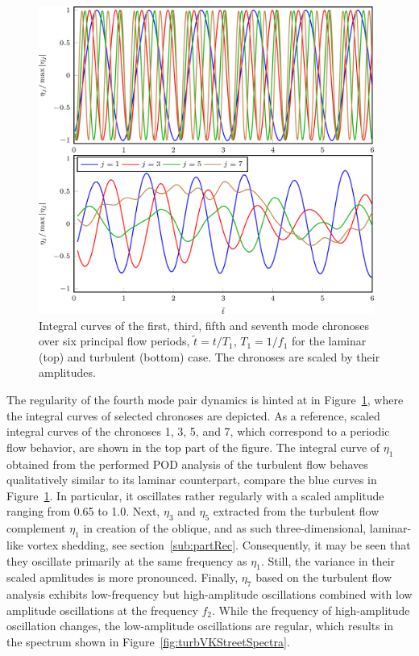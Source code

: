 \begin{figure}[tbp]
    \centering
    \includegraphics[width=0.98\textwidth]{02_images/00_export/figure29.png}
    \caption{Integral curves of the first, third, fifth and seventh mode chronoses over six principal flow periods, $\tilde{t} = t/T_{1}$, $T_{1} = 1/f_{1}$ for the laminar (top) and turbulent (bottom) case. The chronoses are scaled by their amplitudes.}
    \label{fig:appEtasLamInt}
\end{figure}
The regularity of the fourth mode pair dynamics is hinted at in Figure~\ref{fig:appEtasLamInt}, where the integral curves of selected chronoses are depicted. As a reference, scaled integral curves of the chronoses 1, 3, 5, and 7, which correspond to a periodic flow behavior, are shown in the top part of the figure. The integral curve of $\eta_{1}$ obtained from the performed POD analysis of the turbulent flow behaves qualitatively similar to its laminar counterpart, compare the blue curves in Figure~\ref{fig:appEtasLamInt}. In particular, it oscillates rather regularly with a scaled amplitude ranging from 0.65 to 1.0. Next, $\eta_{3}$ and $\eta_{5}$ extracted from the turbulent flow complement $\eta_{1}$ in creation of the oblique, and as such three-dimensional, laminar-like vortex shedding, see section~\ref{sub:partRec}. Consequently, it may be seen that they oscillate primarily at the same frequency as $\eta_{1}$. Still, the variance in their scaled apmlitudes is more pronounced. Finally, $\eta_{7}$ based on the turbulent flow analysis exhibits low-frequency but high-amplitude oscillations combined with low amplitude oscillations at the frequency $f_{2}$. While the frequency of high-amplitude oscillation changes, the low-amplitude oscillations are regular, which results in the spectrum shown in Figure~\ref{fig:turbVKStreetSpectra}.

